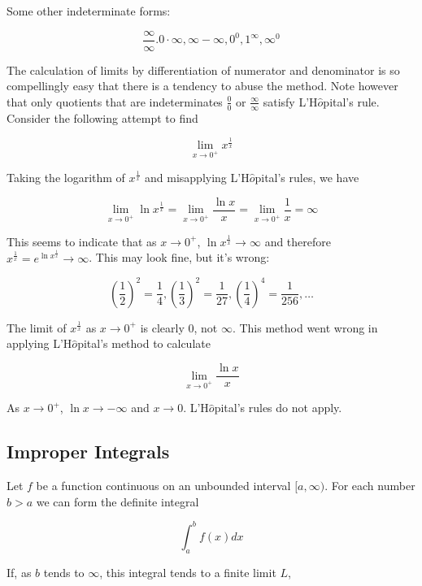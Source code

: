         Some other indeterminate forms:

        \[
            \frac{\infty}{\infty}. 0\cdot\infty, \infty - \infty, 0^0, 1^{\infty}, \infty^0
        \]

        The calculation of limits by differentiation of numerator and denominator is so compellingly easy that there is a tendency to abuse the method. Note however that only quotients that are indeterminates
        $\frac{0}{0}$ or $\frac{\infty}{\infty}$ satisfy L'H$\hat{o}$pital's rule. \\

        Consider the following attempt to find

        \[
            \lim_{x\to 0^+} x^{\frac{1}{x}}
        \]

        Taking the logarithm of $x^{\frac{1}{x}}$ and misapplying L'H$\hat{o}$pital's rules, we have

        \[
            \lim_{x\to 0^+} \ln{x^{\frac{1}{x}}} = \lim_{x\to 0^+} \frac{\ln{x}}{x} = \lim_{x\to 0^+} \frac{1}{x} = \infty
        \]

        This seems to indicate that as $x\to 0^+$, $\ln{x^{\frac{1}{x}}}\to \infty$ and therefore $x^{\frac{1}{x}} = e^{\ln{x^{\frac{1}{x}}}}\to\infty$. This may look fine, but it's wrong:

        \[
            \left(\frac{1}{2}\right)^2 = \frac{1}{4}, \left(\frac{1}{3}\right)^2 = \frac{1}{27}, \left(\frac{1}{4}\right)^4 = \frac{1}{256},\dots
        \]

        The limit of $x^{\frac{1}{x}}$ as $x\to 0^+$ is clearly 0, not $\infty$. This method went wrong in applying L'H$\hat{o}$pital's method to calculate

        \[
            \lim_{x\to 0^+} \frac{\ln{x}}{x}
        \]

        As $x\to 0^+$, $\ln{x}\to -\infty$ and $x\to 0$. L'H$\hat{o}$pital's rules do not apply.
    \subsection{Improper Integrals}     %

        Let $f$ be a function continuous on an unbounded interval $[a,\infty)$. For each number $b > a$ we can form the definite integral

        \[
            \int_a^b f(x)dx
        \]

        If, as $b$ tends to $\infty$, this integral tends to a finite limit $L$,

